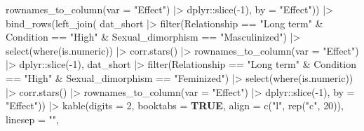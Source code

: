 \documentclass[
  bookmarksnumbered]{article}
\newenvironment{Shaded}{\begin{snugshade}}{\end{snugshade}}
\newcommand{\AttributeTok}[1]{\textcolor[rgb]{0.80,0.80,0.80}{#1}}
\newcommand{\ConstantTok}[1]{\textcolor[rgb]{0.86,0.64,0.64}{\textbf{#1}}}
\newcommand{\DecValTok}[1]{\textcolor[rgb]{0.86,0.86,0.80}{#1}}
\newcommand{\FunctionTok}[1]{\textcolor[rgb]{0.94,0.94,0.56}{#1}}
\newcommand{\NormalTok}[1]{\textcolor[rgb]{0.80,0.80,0.80}{#1}}
\newcommand{\SpecialCharTok}[1]{\textcolor[rgb]{0.86,0.64,0.64}{#1}}
\newcommand{\StringTok}[1]{\textcolor[rgb]{0.80,0.58,0.58}{#1}}
\begin{document}
\begin{Shaded}
\begin{Highlighting}[]
      \FunctionTok{rownames\_to\_column}\NormalTok{(}\AttributeTok{var =} \StringTok{"Effect"}\NormalTok{) }\SpecialCharTok{|\textgreater{}} 
\NormalTok{      dplyr}\SpecialCharTok{::}\FunctionTok{slice}\NormalTok{(}\SpecialCharTok{{-}}\DecValTok{1}\NormalTok{),}
    \AttributeTok{by =} \StringTok{"Effect"}\NormalTok{)) }\SpecialCharTok{|\textgreater{}}
  \FunctionTok{bind\_rows}\NormalTok{(}\FunctionTok{left\_join}\NormalTok{(}
\NormalTok{    dat\_short }\SpecialCharTok{|\textgreater{}}
      \FunctionTok{filter}\NormalTok{(Relationship }\SpecialCharTok{==} \StringTok{"Long term"} \SpecialCharTok{\&}
\NormalTok{               Condition }\SpecialCharTok{==} \StringTok{"High"} \SpecialCharTok{\&} 
\NormalTok{               Sexual\_dimorphism }\SpecialCharTok{==} \StringTok{"Masculinized"}\NormalTok{) }\SpecialCharTok{|\textgreater{}}
      \FunctionTok{select}\NormalTok{(}\FunctionTok{where}\NormalTok{(is.numeric)) }\SpecialCharTok{|\textgreater{}} 
      \FunctionTok{corr.stars}\NormalTok{() }\SpecialCharTok{|\textgreater{}}
      \FunctionTok{rownames\_to\_column}\NormalTok{(}\AttributeTok{var =} \StringTok{"Effect"}\NormalTok{) }\SpecialCharTok{|\textgreater{}} 
\NormalTok{      dplyr}\SpecialCharTok{::}\FunctionTok{slice}\NormalTok{(}\SpecialCharTok{{-}}\DecValTok{1}\NormalTok{),}
\NormalTok{    dat\_short }\SpecialCharTok{|\textgreater{}}
      \FunctionTok{filter}\NormalTok{(Relationship }\SpecialCharTok{==} \StringTok{"Long term"} \SpecialCharTok{\&}
\NormalTok{               Condition }\SpecialCharTok{==} \StringTok{"High"} \SpecialCharTok{\&} 
\NormalTok{               Sexual\_dimorphism }\SpecialCharTok{==} \StringTok{"Feminized"}\NormalTok{) }\SpecialCharTok{|\textgreater{}}
      \FunctionTok{select}\NormalTok{(}\FunctionTok{where}\NormalTok{(is.numeric)) }\SpecialCharTok{|\textgreater{}} 
      \FunctionTok{corr.stars}\NormalTok{() }\SpecialCharTok{|\textgreater{}}
      \FunctionTok{rownames\_to\_column}\NormalTok{(}\AttributeTok{var =} \StringTok{"Effect"}\NormalTok{) }\SpecialCharTok{|\textgreater{}} 
\NormalTok{      dplyr}\SpecialCharTok{::}\FunctionTok{slice}\NormalTok{(}\SpecialCharTok{{-}}\DecValTok{1}\NormalTok{),}
    \AttributeTok{by =} \StringTok{"Effect"}\NormalTok{)) }\SpecialCharTok{|\textgreater{}} 
  \FunctionTok{kable}\NormalTok{(}\AttributeTok{digits =} \DecValTok{2}\NormalTok{,}
        \AttributeTok{booktabs =} \ConstantTok{TRUE}\NormalTok{,}
        \AttributeTok{align =} \FunctionTok{c}\NormalTok{(}\StringTok{"l"}\NormalTok{, }\FunctionTok{rep}\NormalTok{(}\StringTok{"c"}\NormalTok{, }\DecValTok{20}\NormalTok{)),}
        \AttributeTok{linesep =} \StringTok{""}\NormalTok{,}

\end{Highlighting}
\end{Shaded}
\end{document}
